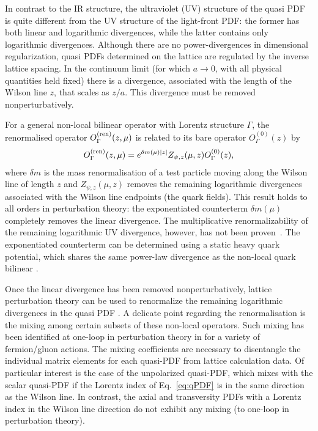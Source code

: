 \begin{itemize}
In contrast to the IR structure, the ultraviolet (UV) structure of the quasi PDF is quite different from the UV structure of the light-front PDF: the former has both linear and logarithmic divergences, while the latter contains only logarithmic divergences. Although there are no power-divergences in dimensional regularization, quasi PDFs determined on the lattice are regulated by the inverse lattice spacing. In the continuum limit (for which $a\to 0$, with all physical quantities held fixed) there is a divergence, associated with the length of the Wilson line $z$, that scales as $z/a$. This divergence must be removed nonperturbatively.

For a general non-local bilinear operator with Lorentz structure $\Gamma$, the renormalised operator $O_{\Gamma}^{\rm (ren)}(z,\mu)$ is
related to its bare operator $O^{(0)}_{\Gamma}(z)$ by \cite{Dotsenko:1979wb, Arefeva:1980zd, Craigie:1980qs,Dorn:1986dt}
\begin{eqnarray}\label{eq:renorm_non-local}
O_{\Gamma}^{\rm (ren)}(z,\mu)=e^{\delta m(\mu)|z|}Z_{\psi, z}(\mu,z)O^{(0)}_{\Gamma}(z),
\end{eqnarray}
where $\delta m$ is the mass renormalisation of a test particle moving along the Wilson line of length $z$ and $Z_{\psi, z}(\mu,z)$ removes the remaining logarithmic divergences associated with the Wilson line endpoints (the quark fields). This result holds to all orders in perturbation theory: the exponentiated counterterm $\delta m(\mu)$ completely removes the linear divergence. The multiplicative renormalizability of the remaining logarithmic UV divergence, however, has not been proven~\cite{Ji:2015jwa}. The exponentiated counterterm can be determined using a static heavy quark potential, which shares the same power-law divergence as the non-local quark bilinear \cite{Musch:2010ka,Ishikawa:2016znu, Chen:2016fxx}.

Once the linear divergence has been removed nonperturbatively, lattice perturbation theory can be used to renormalize the remaining logarithmic divergences in the quasi PDF \cite{Ishikawa:2016znu, Carlson:2017gpk}. A delicate point regarding the renormalisation is the mixing among certain subsets of these non-local operators. Such mixing has been identified at one-loop in perturbation theory in \cite{Constantiou:2017soon} for a variety of fermion/gluon actions. The mixing coefficients are necessary to disentangle the individual matrix elements for each quasi-PDF from lattice calculation data. Of particular interest is the case of the unpolarized quasi-PDF, which mixes with the scalar quasi-PDF if the Lorentz index of Eq.~\eqref{eq:qPDF} is in the same direction as the Wilson line. In contrast, the axial and transversity PDFs with a Lorentz index in the Wilson line direction do not exhibit any mixing (to one-loop in perturbation theory). 


\end{itemize}
